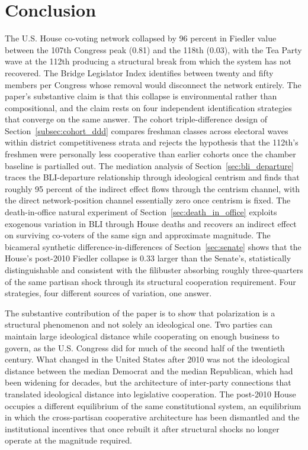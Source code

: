 \documentclass[12pt, a4paper]{article}
\begin{document}
\section{Conclusion}

The U.S. House co-voting network collapsed by 96 percent in Fiedler value between the 107th Congress peak (0.81) and the 118th (0.03), with the Tea Party wave at the 112th producing a structural break from which the system has not recovered. The Bridge Legislator Index identifies between twenty and fifty members per Congress whose removal would disconnect the network entirely. The paper's substantive claim is that this collapse is environmental rather than compositional, and the claim rests on four independent identification strategies that converge on the same answer. The cohort triple-difference design of Section~\ref{subsec:cohort_ddd} compares freshman classes across electoral waves within district competitiveness strata and rejects the hypothesis that the 112th's freshmen were personally less cooperative than earlier cohorts once the chamber baseline is partialled out. The mediation analysis of Section~\ref{sec:bli_departure} traces the BLI-departure relationship through ideological centrism and finds that roughly 95 percent of the indirect effect flows through the centrism channel, with the direct network-position channel essentially zero once centrism is fixed. The death-in-office natural experiment of Section~\ref{sec:death_in_office} exploits exogenous variation in BLI through House deaths and recovers an indirect effect on surviving co-voters of the same sign and approximate magnitude. The bicameral synthetic difference-in-differences of Section~\ref{sec:senate} shows that the House's post-2010 Fiedler collapse is 0.33 larger than the Senate's, statistically distinguishable and consistent with the filibuster absorbing roughly three-quarters of the same partisan shock through its structural cooperation requirement. Four strategies, four different sources of variation, one answer.

The substantive contribution of the paper is to show that polarization is a structural phenomenon and not solely an ideological one. Two parties can maintain large ideological distance while cooperating on enough business to govern, as the U.S. Congress did for much of the second half of the twentieth century. What changed in the United States after 2010 was not the ideological distance between the median Democrat and the median Republican, which had been widening for decades, but the architecture of inter-party connections that translated ideological distance into legislative cooperation. The post-2010 House occupies a different equilibrium of the same constitutional system, an equilibrium in which the cross-partisan cooperative architecture has been dismantled and the institutional incentives that once rebuilt it after structural shocks no longer operate at the magnitude required.
\end{document}
